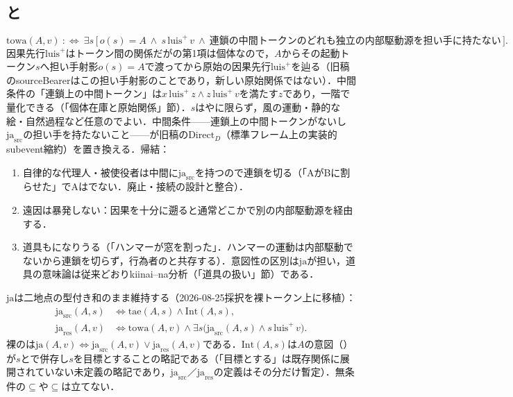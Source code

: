 \documentclass[../../main-detail.tex]{subfiles}
\begin{document}
\subsection{と}
\[
 \mathrm{towa}(A,v)\ :\Longleftrightarrow\
 \exists s\,\bigl[\,o(s)=A\ \land\ s\,\mathrm{luis}^{+}\,v\ \land\
 \text{連鎖の中間トークンのどれも独立の内部駆動源を担い手に持たない}\,\bigr].
\]
因果先行$\mathrm{luis}^{+}$はトークン間の関係だがの第1項は個体なので，$A$からその起動トークン$s$へ担い手射影$o(s)=A$で渡ってから原始の因果先行$\mathrm{luis}^{+}$を辿る（旧稿のsourceBearerはこの担い手射影のことであり，新しい原始関係ではない）．中間条件の「連鎖上の中間トークン」は$x\,\mathrm{luis}^{+}\,z\land z\,\mathrm{luis}^{+}\,v$を満たす$z$であり，一階で量化できる（「個体在庫と原始関係」節）．$s$はやに限らず，風の運動・静的な絵・自然過程など任意のでよい．中間条件——連鎖上の中間トークンがないし$\mathrm{ja}_{\mathrm{src}}$の担い手を持たないこと——が旧稿の$\mathrm{Direct}_D$（標準フレーム上の実装的subevent縮約）を置き換える．帰結：
\begin{enumerate}
    \item 自律的な代理人・被使役者は中間に$\mathrm{ja}_{\mathrm{src}}$を持つので連鎖を切る（「AがBに割らせた」でAはでない．\ko{tact}廃止・\ko{luis}接続の設計と整合）．
    \item 遠因は暴発しない：因果を十分に遡ると通常どこかで別の内部駆動源を経由する．
    \item 道具も\ko{towa}になりうる（「ハンマーが窓を割った」．ハンマーの運動は内部駆動でないから連鎖を切らず，行為者の\ko{towa}と共存する）．意図性の区別は$\mathrm{ja}$が担い，道具の意味論は従来どおりkiinai--na分析（「道具の扱い」節）である．
\end{enumerate}
$\mathrm{ja}$は二地点の型付き和のまま維持する（2026-08-25採択を裸トークン上に移植）：
\begin{align*}
 \mathrm{ja}_{\mathrm{src}}(A,s)&\Longleftrightarrow
 \mathrm{tae}(A,s)\land\mathrm{Int}(A,s),\\
 \mathrm{ja}_{\mathrm{res}}(A,v)&\Longleftrightarrow
 \mathrm{towa}(A,v)\land
 \exists s\bigl(\mathrm{ja}_{\mathrm{src}}(A,s)\land s\,\mathrm{luis}^{+}\,v\bigr).
\end{align*}
裸の\ko{ja}は$\mathrm{ja}(A,v)\Longleftrightarrow\mathrm{ja}_{\mathrm{src}}(A,v)\lor\mathrm{ja}_{\mathrm{res}}(A,v)$である．$\mathrm{Int}(A,s)$は$A$の意図（）が$s$とで併存し$s$を目標とすることの略記である（「目標とする」は既存関係に展開されていない未定義の略記であり，$\mathrm{ja}_{\mathrm{src}}$／$\mathrm{ja}_{\mathrm{res}}$の定義はその分だけ暫定）．無条件の$\subseteq$や$\subseteq$は立てない．
\end{document}
